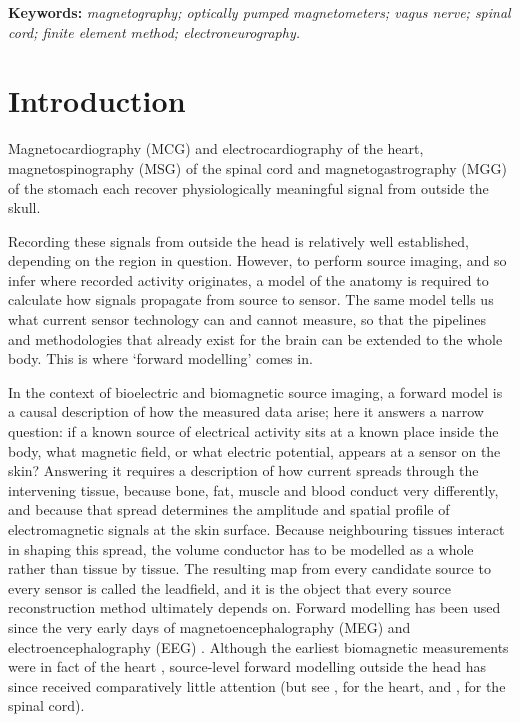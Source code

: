 \documentclass[11pt]{article}
\begin{document}
\noindent\textbf{Keywords:} \emph{magnetography; optically pumped magnetometers;
vagus nerve; spinal cord; finite element method; electroneurography.}

\section{Introduction}\label{introduction}

Magnetocardiography (MCG) and electrocardiography of the heart,
magnetospinography (MSG) of the spinal cord and magnetogastrography
(MGG) of the stomach each recover physiologically meaningful signal from
outside the skull.

Recording these signals from outside the head is relatively well
established, depending on the region in question. However, to perform
source imaging, and so infer where recorded activity originates, a model
of the anatomy is required to calculate how signals propagate from
source to sensor. The same model tells us what current sensor technology
can and cannot measure, so that the pipelines and methodologies that
already exist for the brain can be extended to the whole body. This is
where `forward modelling' comes in.

In the context of bioelectric and biomagnetic source imaging, a forward
model is a causal description of how the measured data arise; here it
answers a narrow question: if a known source of electrical activity sits
at a known place inside the body, what magnetic field, or what electric
potential, appears at a sensor on the skin? Answering it requires a
description of how current spreads through the intervening tissue,
because bone, fat, muscle and blood conduct very differently, and
because that spread determines the amplitude and spatial profile of
electromagnetic signals at the skin surface. Because neighbouring
tissues interact in shaping this spread, the volume conductor has to be
modelled as a whole rather than tissue by tissue. The resulting map from
every candidate source to every sensor is called the leadfield, and it
is the object that every source reconstruction method ultimately depends
on. Forward modelling \citep{227} has been used since the very early
days of magnetoencephalography (MEG) and electroencephalography (EEG)
\citep{195, 196, 226, 228}. Although the earliest biomagnetic
measurements were in fact of the heart \citep{BauleMcFee1963},
source-level forward modelling outside the head has since received
comparatively little attention (but see \citealp{vanOosterom2004}, for the heart, and
\citealp{233, 234}, for the spinal cord).
\end{document}
